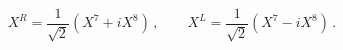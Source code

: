 \begin{equation}
X^R=\frac{1}{\sqrt{2}}\left(X^7+iX^8\right)\,,\qquad
X^L=\frac{1}{\sqrt{2}}\left(X^7-iX^8\right)\,.
\label{LRdef}
\end{equation}

